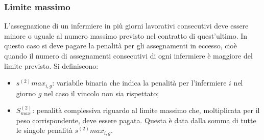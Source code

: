 \subsubsection{Limite massimo}
L'assegnazione di un infermiere in più giorni lavorativi consecutivi deve essere minore o uguale al numero massimo previsto nel contratto di quest'ultimo. 
In questo caso si deve pagare la penalità per gli assegnamenti in eccesso, cioè quando il numero di assegnamenti consecutivi di ogni infermiere è maggiore del limite previsto.
Si definiscono:
\begin{itemize}
\item $s^{(2)}max_{i, g}$: variabile binaria che indica la penalità per l'infermiere $i$ nel giorno $g$ nel caso il vincolo non sia rispettato;
\item $S^{(2)}_{max}$: penalità complessiva riguardo al limite massimo che, moltiplicata per il peso corrispondente, deve essere pagata. Questa è data dalla somma di tutte le singole penalità $s^{(2)}max_{i, g}$.
\end{itemize}

